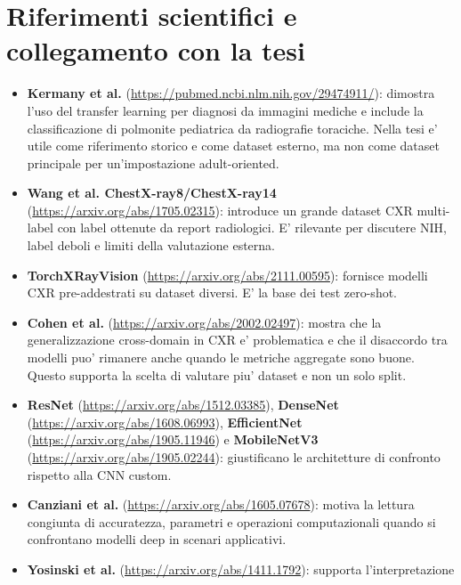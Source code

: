 \documentclass[11pt,a4paper]{article}
\begin{document}
\section{Riferimenti scientifici e collegamento con la tesi}

\begin{itemize}
  \item \textbf{Kermany et al.} \cite{kermany2018}
  (\url{https://pubmed.ncbi.nlm.nih.gov/29474911/}): dimostra l'uso del
  transfer learning per diagnosi da immagini mediche e include la
  classificazione di polmonite pediatrica da radiografie toraciche. Nella tesi
  e' utile come riferimento storico e come dataset esterno, ma non come dataset
  principale per un'impostazione adult-oriented.
  \item \textbf{Wang et al. ChestX-ray8/ChestX-ray14} \cite{wang2017nih}
  (\url{https://arxiv.org/abs/1705.02315}): introduce un grande dataset CXR
  multi-label con label ottenute da report radiologici. E' rilevante per
  discutere NIH, label deboli e limiti della valutazione esterna.
  \item \textbf{TorchXRayVision} \cite{torchxrayvision}
  (\url{https://arxiv.org/abs/2111.00595}): fornisce modelli CXR
  pre-addestrati su dataset diversi. E' la base dei test zero-shot.
  \item \textbf{Cohen et al.} \cite{cohen2020limits}
  (\url{https://arxiv.org/abs/2002.02497}): mostra che la generalizzazione
  cross-domain in CXR e' problematica e che il disaccordo tra modelli puo'
  rimanere anche quando le metriche aggregate sono buone. Questo supporta la
  scelta di valutare piu' dataset e non un solo split.
  \item \textbf{ResNet} \cite{he2016resnet}
  (\url{https://arxiv.org/abs/1512.03385}), \textbf{DenseNet}
  \cite{huang2017densenet} (\url{https://arxiv.org/abs/1608.06993}),
  \textbf{EfficientNet} \cite{tan2019efficientnet}
  (\url{https://arxiv.org/abs/1905.11946}) e \textbf{MobileNetV3}
  \cite{howard2019mobilenetv3} (\url{https://arxiv.org/abs/1905.02244}):
  giustificano le architetture di confronto rispetto alla CNN custom.
  \item \textbf{Canziani et al.} \cite{canziani2016analysis}
  (\url{https://arxiv.org/abs/1605.07678}): motiva la lettura congiunta di
  accuratezza, parametri e operazioni computazionali quando si confrontano
  modelli deep in scenari applicativi.
  \item \textbf{Yosinski et al.} \cite{yosinski2014transferable}
  (\url{https://arxiv.org/abs/1411.1792}): supporta l'interpretazione

\end{itemize}
\end{document}

